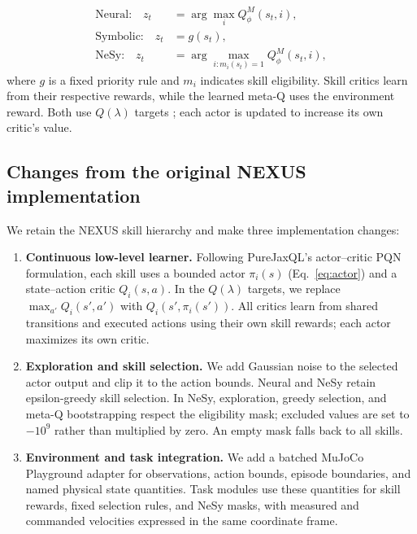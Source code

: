 \documentclass[conference,letterpaper,10pt]{IEEEtran}
\begin{document}
\begin{align}
\text{Neural:}\quad z_t &= \arg\max_i Q^M_\phi(s_t,i),\\
\text{Symbolic:}\quad z_t &= g(s_t),\\
\text{NeSy:}\quad z_t &= \arg\max_{i:m_i(s_t)=1}Q^M_\phi(s_t,i),
\label{eq:selectors}
\end{align}
where $g$ is a fixed priority rule and $m_i$ indicates skill eligibility. Skill critics learn from their respective rewards, while the learned meta-Q uses the environment reward. Both use $Q(\lambda)$ targets \cite{pqn}; each actor is updated to increase its own critic's value.


\subsection{Changes from the original NEXUS implementation}
We retain the NEXUS skill hierarchy \cite{nexus} and make three implementation changes:
\begin{enumerate}
\item \textbf{Continuous low-level learner.} Following PureJaxQL's actor--critic PQN formulation, each skill uses a bounded actor $\pi_i(s)$ (Eq.~\ref{eq:actor}) and a state--action critic $Q_i(s,a)$. In the $Q(\lambda)$ targets, we replace $\max_{a'}Q_i(s',a')$ with $Q_i(s',\pi_i(s'))$. All critics learn from shared transitions and executed actions using their own skill rewards; each actor maximizes its own critic.
\item \textbf{Exploration and skill selection.} We add Gaussian noise to the selected actor output and clip it to the action bounds. Neural and NeSy retain epsilon-greedy skill selection. In NeSy, exploration, greedy selection, and meta-Q bootstrapping respect the eligibility mask; excluded values are set to $-10^9$ rather than multiplied by zero. An empty mask falls back to all skills.
\item \textbf{Environment and task integration.} We add a batched MuJoCo Playground adapter for observations, action bounds, episode boundaries, and named physical state quantities. Task modules use these quantities for skill rewards, fixed selection rules, and NeSy masks, with measured and commanded velocities expressed in the same coordinate frame.
\end{enumerate}
\end{document}
